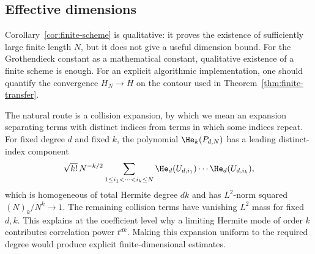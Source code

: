 \subsection{Effective dimensions}

Corollary~\ref{cor:finite-scheme} is qualitative: it proves the existence of sufficiently large finite length $N$, but it does not give a useful dimension bound.  For the Grothendieck constant as a mathematical constant, qualitative existence of a finite scheme is enough.  For an explicit algorithmic implementation, one should quantify the convergence $H_N\to H$ on the contour used in Theorem~\ref{thm:finite-transfer}.

The natural route is a collision expansion, by which we mean an expansion separating terms with distinct indices from terms in which some indices repeat.  For fixed degree $d$ and fixed $k$, the polynomial $\He_k(P_{d,N})$ has a leading distinct-index component
\[
  \sqrt{k!}\,N^{-k/2}
  \sum_{1\le i_1<\cdots<i_k\le N}
  \He_d(U_{d,i_1})\cdots \He_d(U_{d,i_k}),
\]
which is homogeneous of total Hermite degree $dk$ and has $L^2$-norm squared $(N)_k/N^k\to1$.  The remaining collision terms have vanishing $L^2$ mass for fixed $d,k$.  This explains at the coefficient level why a limiting Hermite mode of order $k$ contributes correlation power $t^{dk}$.  Making this expansion uniform to the required degree would produce explicit finite-dimensional estimates.
